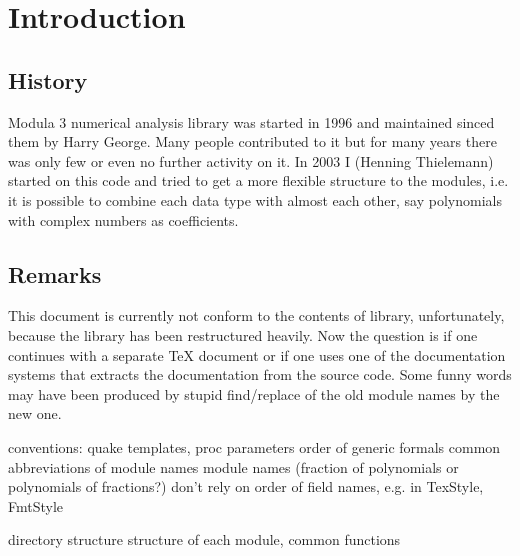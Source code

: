 \section{Introduction}

\subsection{History}

Modula 3 numerical analysis library was started in 1996 and
maintained sinced them by Harry George.
Many people contributed to it
but for many years there was only few or even no further activity on it.
In 2003 I (Henning Thielemann) started on this code
and tried to get a more flexible structure to the modules,
i.e. it is possible to combine each data type with almost each other,
say polynomials with complex numbers as coefficients.

\subsection{Remarks}

This document is currently not conform
to the contents of library, unfortunately,
because the library has been restructured heavily.
Now the question is
if one continues with a separate TeX document
or if one uses one of the documentation systems
that extracts the documentation from the source code.
Some funny words may have been produced by stupid
find/replace of the old module names by the new one.



conventions:
quake templates, proc parameters
order of generic formals
common abbreviations of module names
module names (fraction of polynomials or polynomials of fractions?)
don't rely on order of field names, e.g. in TexStyle, FmtStyle

directory structure
structure of each module, common functions
